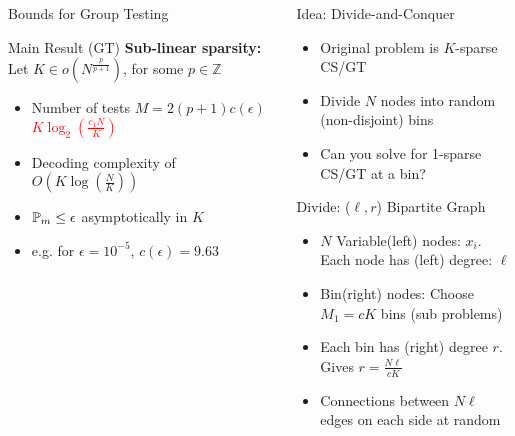 \documentclass[final]{beamer}
\newlength{\onecolwid}
\newlength{\twocolwid}
\newlength{\blockskip}
\newlength{\negativeskip}
\begin{document}
\begin{frame}
\begin{columns}[t]
\begin{column}{\onecolwid}
\begin{block}{\Large Bounds for Group Testing}
	 
   \begin{alertblock}{\Large Main Result (GT)} 
	    \textbf{Sub-linear sparsity: }Let $K\in o(N^{\frac{p}{p+1}})$, for some $p\in\mathbb{Z}$
			\begin{itemize}
			\itemsep10pt
				\item Number of tests  $M=2(p+1)c(\epsilon)$ \textcolor{red}{$K\log_2 (\frac{c_1N}{K})$}
				\item Decoding complexity of $O\left(K\log(\frac{N}{K})\right)$ 
				\item $\mathbb{P}_{m}\leq \epsilon$ asymptotically in $K$
				\item e.g. for $\epsilon=10^{-5}$, $c(\epsilon)=9.63$
			\end{itemize}
    	\end{alertblock}
	 \end{block}
  \end{column}

  \begin{column}{\twocolwid}
    \vspace{\negativeskip}

    \begin{block}{\Large Idea: Divide-and-Conquer}
    \begin{itemize}
		\item Original problem is $K$-sparse CS/GT  
    	\item Divide $N$ nodes into random (non-disjoint) bins
	    \item Can you solve for 1-sparse CS/GT at a bin?
    \end{itemize}

    \begin{figure}
       \center
		\scalebox{1.3}{}
	\end{figure}

    \end{block}
    \vspace{\blockskip}

    \begin{block}{\Large Divide: ($\ell,r$) Bipartite Graph}
    \begin{itemize}
	    \item $N$ Variable(left) nodes: $x_i$. Each node has (left) degree: $\ell$
	    \item Bin(right) nodes: Choose $M_1=cK$ bins (sub problems)
	    \item  Each bin has (right) degree $r$. Gives $r=\frac{N\ell}{cK}$
	    \item Connections between $N\ell$ edges on each side at random
    \end{itemize}
    \end{block}  
\vspace{\blockskip}


\end{column}
\end{columns}
\end{frame}
\end{document}
